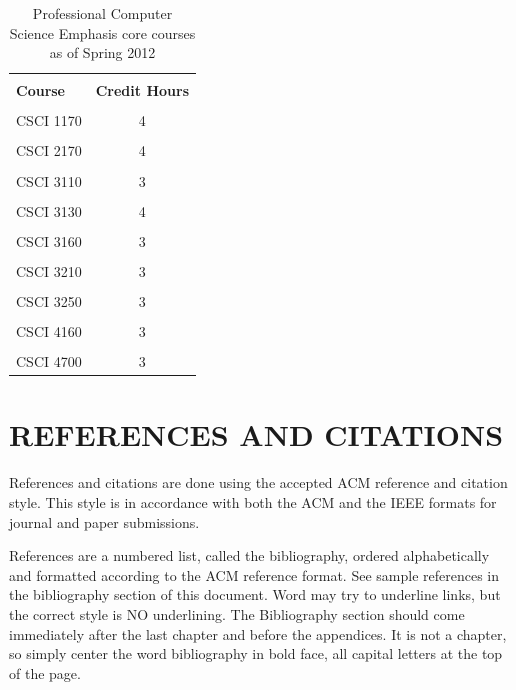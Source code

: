 \documentclass[12pt, oneside]{book}
\begin{document}
\begin{table}[!b]
{\hspace{0cm}
\begin{tabular}{|p{3.5cm}|c|}
\hline \\ [-1.5ex]
\textbf{Course}    & \textbf{Credit Hours} \\
\hline \\ [-1.5ex]
CSCI 1170 & 4  \\
\hline \\ [-1.5ex]
CSCI 2170 & 4  \\
\hline \\ [-1.5ex]
CSCI 3110 & 3  \\
\hline \\ [-1.5ex]
CSCI 3130 & 4   \\
\hline \\ [-1.5ex]
CSCI 3160 & 3  \\
\hline \\ [-1.5ex]
CSCI 3210 & 3 \\
\hline \\ [-1.5ex]
CSCI 3250 & 3 \\
\hline \\ [-1.5ex]
CSCI 4160 & 3 \\
\hline \\ [-1.5ex]
CSCI 4700 & 3\\
\hline
\end{tabular}
}
\caption{Professional Computer Science Emphasis core courses as of Spring 2012}
\label{tab:courses}
\end{table}


\chapter{\textbf{REFERENCES AND CITATIONS}}
	References and citations are done using the accepted ACM reference and citation style.  This style is in accordance with both the ACM  \cite{bowman1993reasoning} and the IEEE \cite{forman2003extensive} formats for journal and paper submissions.  
	
	References are a numbered list, called the bibliography, ordered alphabetically and formatted according to the ACM reference format.  See sample references in the bibliography section of this document.  Word may try to underline links, but the correct style is NO underlining.  The Bibliography section should come immediately after the last chapter and before the appendices.  It is not a chapter, so simply center the word bibliography in bold face, all capital letters at the top of the page.
	
\end{document}
